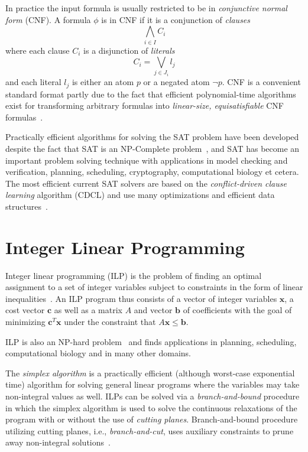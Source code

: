 \documentclass[12pt,a4paper]{article}
\begin{document}
In practice the input formula is usually restricted to be in \emph{conjunctive normal form} (CNF).
A formula $\phi$ is in CNF if it is a conjunction of \emph{clauses}
$$ \bigwedge_{i\in I} C_i $$
where each clause $C_i$ is a disjunction of \emph{literals}
$$ C_i = \bigvee_{j\in J_i} l_j $$
and each literal $l_j$ is either an atom $p$ or a negated atom $\neg p$.
CNF is a convenient standard format partly due to the fact that efficient polynomial-time algorithms exist for transforming arbitrary formulas into \emph{linear-size, equisatisfiable} CNF formulas~\cite{tseitin1983, DBLP:journals/jsc/PlaistedG86}.

Practically efficient algorithms for solving the SAT problem have been developed despite the fact that SAT is an NP-Complete problem~\cite{DBLP:conf/stoc/Cook71}, 
and SAT has become an important problem solving technique with applications in model checking and verification, planning, scheduling, cryptography, computational biology et cetera.
The most efficient current SAT solvers are based on the \emph{conflict-driven clause learning} algorithm (CDCL) and use many optimizations and efficient data structures~\cite{DBLP:conf/iccad/SilvaS96, DBLP:journals/tc/Marques-SilvaS99, DBLP:conf/dac/MoskewiczMZZM01, DBLP:conf/aaai/GomesSK98, DBLP:journals/dam/GoldbergN07, ryan2004efficient, DBLP:conf/aaai/BayardoS97, DBLP:conf/sat/LewisSB05}.


\section{Integer Linear Programming}
\label{sec:ilp}
Integer linear programming (ILP) is the problem of finding an optimal assignment to a set of integer variables subject to constraints in the form of linear inequalities~\cite{DBLP:books/ph/PapadimitriouS82}.
An ILP program thus consists of a vector of integer variables $\mathbf{x}$, a cost vector $\mathbf{c}$ as well as a matrix $A$ and vector $\mathbf{b}$ of coefficients with the goal of minimizing $\mathbf{c}^T \mathbf{x}$ under the constraint that $A\mathbf{x} \leq \mathbf{b}$.

ILP is also an NP-hard problem~\cite{DBLP:conf/coco/Karp72} and finds applications in planning, scheduling, computational biology and in many other domains.

The \emph{simplex algorithm} is a practically efficient (although worst-case exponential time) algorithm for solving general linear programs where the variables may take non-integral values as well.
ILPs can be solved via a \emph{branch-and-bound} procedure in which the simplex algorithm is used to solve the continuous relaxations of the program with or without the use of \emph{cutting planes}.
Branch-and-bound procedure utilizing cutting planes, i.e., \emph{branch-and-cut}, uses auxiliary constraints to prune away non-integral solutions~\cite{DBLP:books/ph/PapadimitriouS82}.
\end{document}
